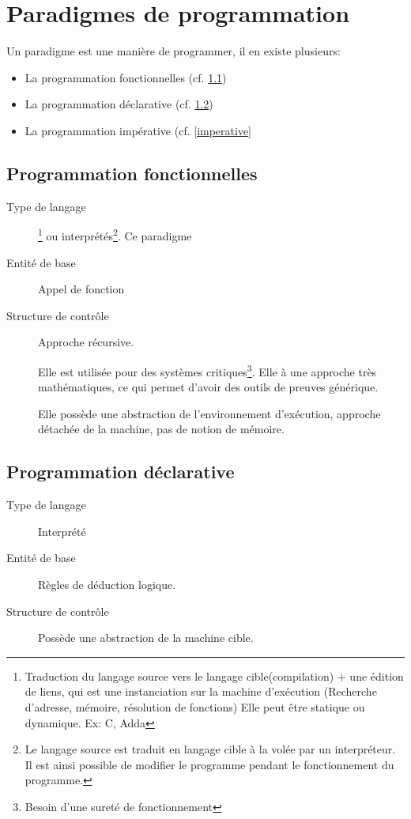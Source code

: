 \documentclass[12pt,a4paper,openany]{book}
\begin{document}
	\setcounter{tocdepth}{1}
	\setcounter{secnumdepth}{3}
	\maketitle
	\tableofcontents
	\chapter{Paradigmes de programmation}
		Un paradigme est une manière de programmer, il en existe plusieurs: 
		\begin{itemize}
			\item La programmation fonctionnelles (cf. \ref{fonctionnelles})
			\item La programmation déclarative (cf. \ref{declarative})
			\item La programmation impérative (cf. \ref{imperative}
		\end{itemize}
		\section{Programmation fonctionnelles} \label{fonctionnelles}
		\begin{description}
		\item[Type de langage] \footnote{Traduction du langage source vers le langage cible(compilation) + une édition de liens, qui est une instanciation sur la machine d'exécution (Recherche d'adresse, mémoire, résolution de fonctions) Elle peut être statique ou dynamique. Ex: C, Adda} ou interprétés\footnote{
		Le langage source est traduit en langage cible à la volée par un interpréteur. Il est ainsi possible de modifier le programme pendant le fonctionnement du programme.}. Ce paradigme
		\item[Entité de base] Appel de fonction
		\item[Structure de contrôle] Approche récursive. 


		Elle est utilisée pour des systèmes critiques\footnote{Besoin d'une sureté de fonctionnement}. Elle à une approche très mathématiques, ce qui 
		permet d'avoir des outils de preuves générique.

		Elle possède une abstraction de l'environnement d'exécution, approche détachée de la machine, pas de notion de mémoire.

	\end{description}
	\section{Programmation déclarative} \label{declarative}
		\begin{description}
			\item[Type de langage] Interprété
			\item[Entité de base] Règles de déduction logique.
			\item[Structure de contrôle  ]
			Possède une abstraction de la machine cible.
		\end{description}
		\newpage
\end{document}
